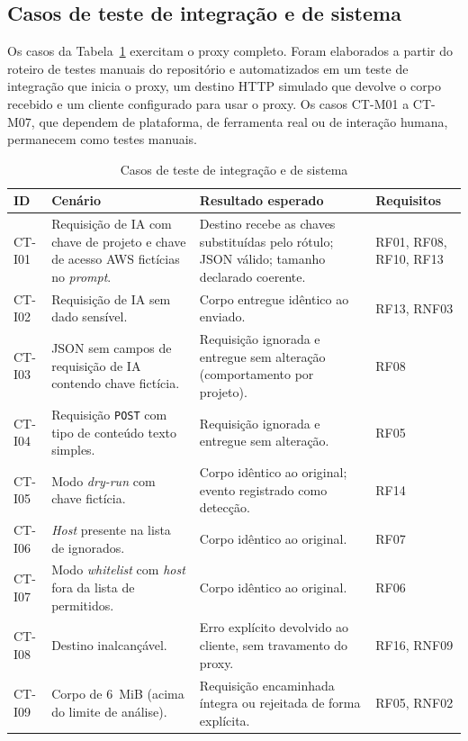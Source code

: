 \subsection{Casos de teste de integração e de sistema}

Os casos da Tabela~\ref{tab:integracao} exercitam o proxy completo. Foram elaborados a partir do roteiro de testes manuais do repositório e automatizados em um teste de integração que inicia o proxy, um destino HTTP simulado que devolve o corpo recebido e um cliente configurado para usar o proxy. Os casos CT-M01 a CT-M07, que dependem de plataforma, de ferramenta real ou de interação humana, permanecem como testes manuais.

\begin{table}[htb]
\centering
\caption{Casos de teste de integração e de sistema}\label{tab:integracao}
\small
\begin{tabular}{|p{1.35cm}|p{4.4cm}|p{5.6cm}|p{2.3cm}|}
\hline
\textbf{ID} & \textbf{Cenário} & \textbf{Resultado esperado} & \textbf{Requisitos} \\ \hline
CT-I01 & Requisição de IA com chave de projeto e chave de acesso AWS fictícias no \textit{prompt}. & Destino recebe as chaves substituídas pelo rótulo; JSON válido; tamanho declarado coerente. & RF01, RF08, RF10, RF13 \\ \hline
CT-I02 & Requisição de IA sem dado sensível. & Corpo entregue idêntico ao enviado. & RF13, RNF03 \\ \hline
CT-I03 & JSON sem campos de requisição de IA contendo chave fictícia. & Requisição ignorada e entregue sem alteração (comportamento por projeto). & RF08 \\ \hline
CT-I04 & Requisição \texttt{POST} com tipo de conteúdo texto simples. & Requisição ignorada e entregue sem alteração. & RF05 \\ \hline
CT-I05 & Modo \textit{dry-run} com chave fictícia. & Corpo idêntico ao original; evento registrado como detecção. & RF14 \\ \hline
CT-I06 & \textit{Host} presente na lista de ignorados. & Corpo idêntico ao original. & RF07 \\ \hline
CT-I07 & Modo \textit{whitelist} com \textit{host} fora da lista de permitidos. & Corpo idêntico ao original. & RF06 \\ \hline
CT-I08 & Destino inalcançável. & Erro explícito devolvido ao cliente, sem travamento do proxy. & RF16, RNF09 \\ \hline
CT-I09 & Corpo de 6~MiB (acima do limite de análise). & Requisição encaminhada íntegra ou rejeitada de forma explícita. & RF05, RNF02 \\ \hline

\end{tabular}
\end{table}
